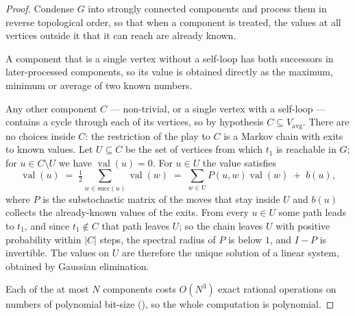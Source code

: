 \documentclass[11pt]{article}
\theoremstyle{plain}
\theoremstyle{definition}
\DeclareMathOperator{\val}{val}
\newcommand{\Vavg}{V_{\mathrm{avg}}}
\begin{document}
\begin{proof}
Condense $G$ into strongly connected components and process them in
reverse topological order, so that when a component is treated, the
values at all vertices outside it that it can reach are already known.

A component that is a single vertex without a self-loop has both
successors in later-processed components, so its value is obtained
directly as the maximum, minimum or average of two known numbers.

Any other component $C$ --- non-trivial, or a single vertex with a
self-loop --- contains a cycle through each of its vertices, so by
hypothesis $C\subseteq\Vavg$. There are no choices inside $C$: the
restriction of the play to $C$ is a Markov chain with exits to known
values. Let $U\subseteq C$ be the set of vertices from which $t_1$ is
reachable in $G$; for $u\in C\setminus U$ we have $\val(u)=0$. For
$u\in U$ the value satisfies
\[
  \val(u)\;=\;\tfrac12\!\!\sum_{w\in\mathrm{succ}(u)}\!\!\val(w)
  \;=\;\sum_{w\in U}P(u,w)\val(w)\;+\;b(u),
\]
where $P$ is the substochastic matrix of the moves that stay inside $U$
and $b(u)$ collects the already-known values of the exits. From every
$u\in U$ some path leads to $t_1$, and since $t_1\notin C$ that path
leaves $U$; so the chain leaves $U$ with positive probability within
$|C|$ steps, the spectral radius of $P$ is below $1$, and $I-P$ is
invertible. The values on $U$ are therefore the unique solution of a
linear system, obtained by Gaussian elimination.

Each of the at most $N$ components costs $O(N^{3})$ exact rational
operations on numbers of polynomial bit-size (), so
the whole computation is polynomial.
\end{proof}
\end{document}
